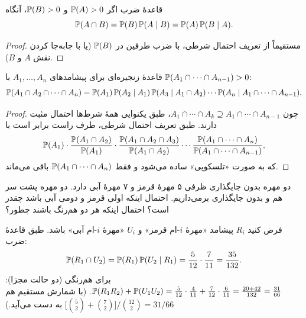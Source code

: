 \begin{theorem}[label=thm:mult-rule]{قاعدهٔ ضرب}
اگر $\P(A)>0$ و $\P(B)>0$، آنگاه
\[ \P(A\cap B)=\P(B)\,\P(A\mid B)=\P(A)\,\P(B\mid A). \]
\end{theorem}

\begin{proof}
مستقیماً از تعریف احتمال شرطی، با ضرب طرفین در $\P(B)$ (یا با جابه‌جا کردن نقش $A$ و $B$).
\end{proof}

\begin{theorem}[label=thm:chain]{قاعدهٔ زنجیره‌ای}
برای پیشامدهای $A_1,\dots,A_n$ با $\P(A_1\cap\cdots\cap A_{n-1})>0$:
\[ \P(A_1\cap A_2\cap\cdots\cap A_n)=\P(A_1)\,\P(A_2\mid A_1)\,\P(A_3\mid A_1\cap A_2)\cdots\P(A_n\mid A_1\cap\cdots\cap A_{n-1}). \]
\end{theorem}

\begin{proof}
چون $A_1\cap\cdots\cap A_k\supseteq A_1\cap\cdots\cap A_{n-1}$، طبق یکنوایی همهٔ شرط‌ها احتمال مثبت دارند. طبق تعریف احتمال شرطی، طرف راست برابر است با
\[ \P(A_1)\cdot\frac{\P(A_1\cap A_2)}{\P(A_1)}\cdot\frac{\P(A_1\cap A_2\cap A_3)}{\P(A_1\cap A_2)}\cdots\frac{\P(A_1\cap\cdots\cap A_n)}{\P(A_1\cap\cdots\cap A_{n-1})}, \]
که به صورت «تلسکوپی» ساده می‌شود و فقط $\P(A_1\cap\cdots\cap A_n)$ باقی می‌ماند.
\end{proof}

\begin{example}{دو مهره بدون جایگذاری}
ظرفی ۵ مهرهٔ قرمز و ۷ مهرهٔ آبی دارد. دو مهره پشت سر هم و بدون جایگذاری برمی‌داریم. احتمال اینکه اولی قرمز و دومی آبی باشد چقدر است؟ احتمال اینکه هر دو هم‌رنگ باشند چطور؟
\begin{solution}
فرض کنید $R_i$ پیشامد «مهرهٔ $i$-ام قرمز» و $U_i$ «مهرهٔ $i$-ام آبی» باشد. طبق قاعدهٔ ضرب:
\[ \P(R_1\cap U_2)=\P(R_1)\,\P(U_2\mid R_1)=\frac5{12}\cdot\frac7{11}=\frac{35}{132}. \]
برای هم‌رنگی (دو حالت مجزا):
$\P(R_1R_2)+\P(U_1U_2)=\frac5{12}\cdot\frac4{11}+\frac7{12}\cdot\frac6{11}=\frac{20+42}{132}=\frac{31}{66}$.
(با شمارش مستقیم هم $\bigl[\binom52+\binom72\bigr]/\binom{12}2=31/66$ به دست می‌آید.)
\end{solution}
\end{example}


